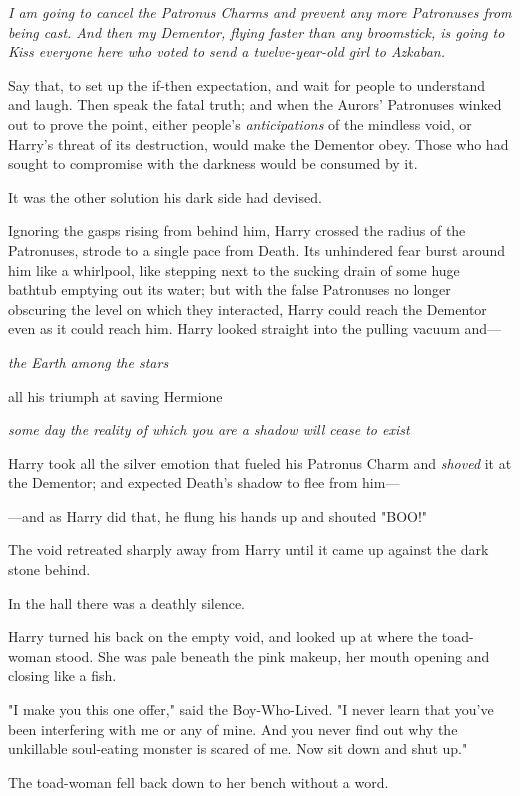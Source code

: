 \emph{I am going to cancel the Patronus Charms and prevent any more Patronuses
from being cast. And then my Dementor, flying faster than any broomstick, is
going to Kiss everyone here who voted to send a twelve-year-old girl to
Azkaban.}

Say that, to set up the if-then expectation, and wait for people to understand
and laugh. Then speak the fatal truth; and when the Aurors' Patronuses winked
out to prove the point, either people's \emph{anticipations} of the mindless
void, or Harry's threat of its destruction, would make the Dementor obey. Those
who had sought to compromise with the darkness would be consumed by it.

It was the other solution his dark side had devised.

Ignoring the gasps rising from behind him, Harry crossed the radius of the
Patronuses, strode to a single pace from Death. Its unhindered fear burst
around him like a whirlpool, like stepping next to the sucking drain of some
huge bathtub emptying out its water; but with the false Patronuses no longer
obscuring the level on which they interacted, Harry could reach the Dementor
even as it could reach him. Harry looked straight into the pulling vacuum and---

\emph{the Earth among the stars}

all his triumph at saving Hermione

\emph{some day the reality of which you are a shadow will cease to exist}

Harry took all the silver emotion that fueled his Patronus Charm and
\emph{shoved} it at the Dementor; and expected Death's shadow to flee from
him---

---and as Harry did that, he flung his hands up and shouted "BOO!"

The void retreated sharply away from Harry until it came up against the dark
stone behind.

In the hall there was a deathly silence.

Harry turned his back on the empty void, and looked up at where the toad-woman
stood. She was pale beneath the pink makeup, her mouth opening and closing like
a fish.

"I make you this one offer," said the Boy-Who-Lived. "I never learn that you've
been interfering with me or any of mine. And you never find out why the
unkillable soul-eating monster is scared of me. Now sit down and shut up."

The toad-woman fell back down to her bench without a word.

